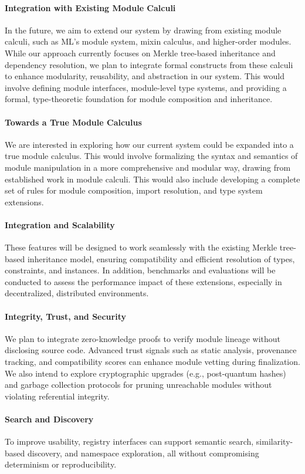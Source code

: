 \documentclass[sigplan,screen]{acmart}
\begin{document}
\paragraph{Integration with Existing Module Calculi} In the future, we aim to extend our system by drawing from existing module calculi, such as ML's module system, mixin calculus, and higher-order modules. While our approach currently focuses on Merkle tree-based inheritance and dependency resolution, we plan to integrate formal constructs from these calculi to enhance modularity, reusability, and abstraction in our system. This would involve defining module interfaces, module-level type systems, and providing a formal, type-theoretic foundation for module composition and inheritance.

\paragraph{Towards a True Module Calculus} We are interested in exploring how our current system could be expanded into a true module calculus. This would involve formalizing the syntax and semantics of module manipulation in a more comprehensive and modular way, drawing from established work in module calculi. This would also include developing a complete set of rules for module composition, import resolution, and type system extensions.

\paragraph{Integration and Scalability} These features will be designed to work seamlessly with the existing Merkle tree-based inheritance model, ensuring compatibility and efficient resolution of types, constraints, and instances. In addition, benchmarks and evaluations will be conducted to assess the performance impact of these extensions, especially in decentralized, distributed environments.

\paragraph{Integrity, Trust, and Security} We plan to integrate zero-knowledge proofs to verify module lineage without disclosing source code. Advanced trust signals such as static analysis, provenance tracking, and compatibility scores can enhance module vetting during finalization. We also intend to explore cryptographic upgrades (e.g., post-quantum hashes) and garbage collection protocols for pruning unreachable modules without violating referential integrity.

\paragraph{Search and Discovery} To improve usability, registry interfaces can support semantic search, similarity-based discovery, and namespace exploration, all without compromising determinism or reproducibility.



\end{document}
